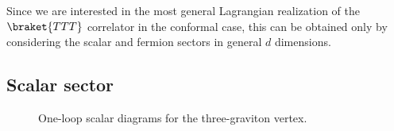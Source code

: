 \documentclass[a4paper,11pt,openright,twoside]{book}
\numberwithin{equation}{section}
\begin{document}
{{\noindent Since we are interested in the most general Lagrangian realization of the $\braket{TTT}$ correlator in the conformal case, this can be obtained only by considering the scalar and fermion sectors in general $d$ dimensions.  

\subsection{Scalar sector}

\begin{figure}[t]
	\centering
	\vspace{-1.5cm}
	 \hspace{.3cm}
	 \hspace{.3cm}
	\vspace{-0.8cm}\caption{One-loop scalar diagrams for the three-graviton vertex.\label{Feynman1}}
\end{figure}

}}
\end{document}
